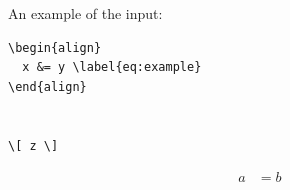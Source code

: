 An example of the input:
\begin{verbatim}
\begin{align}
  x &= y \label{eq:example}
\end{align}


\[ z \]
\end{verbatim}
\begin{align}
  a &= b \label{eq:dead}
\end{align}
